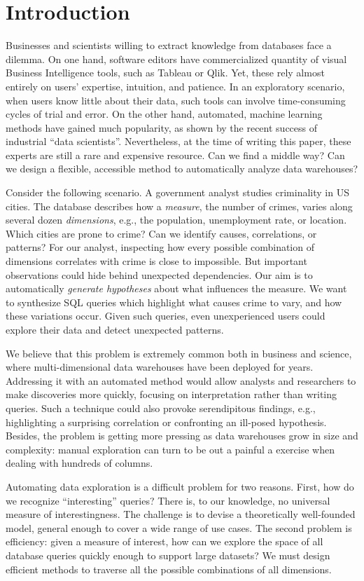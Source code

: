 \section{Introduction}
\label{sec:intro}
Businesses and scientists willing to extract knowledge from databases face a
dilemma. On one hand, software editors have commercialized quantity of visual
Business Intelligence tools, such as Tableau or Qlik. Yet, these rely almost
entirely on users' expertise, intuition, and patience. In an exploratory
scenario, when users know little about their data, such tools can involve
time-consuming cycles of trial and error. On the other hand, automated, machine
learning methods have gained much popularity, as shown by the recent success of
industrial ``data scientists''. Nevertheless, at the time of writing this
paper, these experts are still a rare and expensive resource. Can we find a
middle way? Can we design a flexible, accessible method to automatically
analyze data warehouses?

Consider the following scenario. A government analyst studies criminality in US
cities. The database describes how a \emph{measure}, the number of crimes,
varies along several dozen \emph{dimensions}, e.g., the population,
unemployment rate, or location.  Which cities are prone to crime?  Can we
identify causes, correlations, or patterns? For our analyst, inspecting how
every possible combination of dimensions correlates with crime is close to
impossible. But important observations could hide behind unexpected dependencies.
Our aim is to automatically \emph{generate hypotheses} about what influences
the measure.  We want to synthesize SQL queries which highlight what causes
crime to vary, and how these variations occur. Given such queries, even
unexperienced users could explore their data and detect unexpected patterns.

We believe that this problem is extremely common both in business and science,
where multi-dimensional data warehouses have been deployed for years.
Addressing it with an automated method would allow analysts and researchers to
make discoveries more quickly, focusing on interpretation rather than writing
queries. Such a technique could also provoke serendipitous findings, e.g.,
highlighting a surprising correlation or confronting an ill-posed hypothesis.
Besides, the problem is getting more pressing as data warehouses grow in size
and complexity: manual exploration can turn to be out a painful a exercise when
dealing with hundreds of columns.

Automating data exploration is a difficult problem for two reasons.  First, how
do we recognize ``interesting'' queries?  There is, to our knowledge, no
universal measure of inte\-restingness. The challenge is to devise a
theoretically well-founded model, general enough to cover a wide range of use
cases. The second problem is efficiency: given a measure of interest, how can
we explore the space of all database queries quickly enough to support large
datasets? We must design efficient methods to traverse all the possible
combinations of all dimensions.


